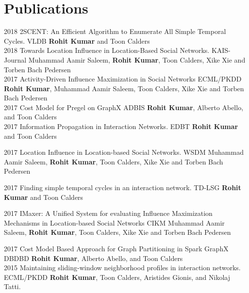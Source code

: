 \documentclass[]{cv-class}
\begin{document}
\section{Publications}
\begin{entrylist}
	\entry
	{2018}
	{2SCENT: An Efficient Algorithm to Enumerate All Simple Temporal Cycles.}
	{VLDB}
	{\textbf{Rohit Kumar} and Toon Calders\\}
	\entry
	{2018}
	{Towards Location Influence in Location-Based Social Networks.}
	{KAIS-Journal}
	{Muhammad Aamir Saleem, \textbf{Rohit Kumar}, Toon Calders, Xike Xie and Torben Bach Pedersen\\}
	\entry
	{2017}
	{Activity-Driven Influence Maximization in Social Networks}
	{ECML/PKDD}
	{\textbf{Rohit Kumar}, Muhammad Aamir Saleem, Toon Calders, Xike Xie and Torben Bach Pedersen\\}
	\entry
	{2017}
	{Cost Model for Pregel on GraphX}
	{ADBIS}
	{\textbf{Rohit Kumar}, Alberto Abello, and Toon Calders\\}
		\entry
	{2017}
	{Information Propagation in Interaction Networks.}
	{EDBT}
	{\textbf{Rohit Kumar} and Toon Calders\\}
		
	\entry
	{2017}
	{Location Influence in Location-based Social Networks.}
	{WSDM}
	{Muhammad Aamir Saleem, \textbf{Rohit Kumar}, Toon Calders, Xike Xie and Torben Bach Pedersen\\}
	\end{entrylist}
	\begin{entrylist}
	\entry
	{2017}
	{Finding simple temporal cycles in an interaction network.}
	{TD-LSG}
	{\textbf{Rohit Kumar} and Toon Calders\\}
		
	\entry
	{2017}
	{IMaxer: A Unified System for evaluating Influence Maximization Mechanisms in Location-based Social Networks}
	{CIKM}
	{Muhammad Aamir Saleem, \textbf{Rohit Kumar}, Toon Calders, Xike Xie and Torben Bach Pedersen\\}

	\entry
	{2017}
	{Cost Model Based Approach for Graph Partitioning in Spark GraphX}
	{DBDBD}
	{\textbf{Rohit Kumar}, Alberto Abello, and Toon Calders\\}
	\entry
	{2015}
	{Maintaining sliding-window neighborhood profiles in interaction networks.}
	{ECML/PKDD}
	{\textbf{Rohit Kumar}, Toon Calders, Aristides Gionis, and Nikolaj Tatti.\\}
	\end{entrylist}
\end{document}
